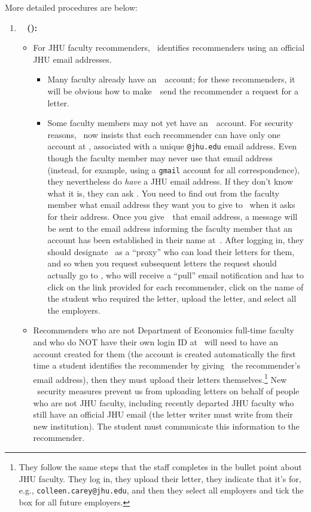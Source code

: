 \documentclass{\classes/econtex}
\begin{document}
More detailed procedures are below:
\begin{enumerate}

\item \textbf{\EJM ~ (\EJMLink):}
  \begin{itemize}
  \item For JHU faculty recommenders, \EJM~identifies recommenders using
    an official JHU email addresses.  

    \begin{itemize}
    \item Many faculty already have an~\EJM~account; for these
      recommenders, it will be obvious how to make~\EJM~send the
      recommender a request for a letter.

    \item Some faculty members may not yet have an~\EJM~account.  
      For security reasons, \EJM~now insists that each
      recommender can have only one account at \EJM, associated with a
      unique \texttt{@jhu.edu} email address.  Even though the faculty member may never use
      that email address (instead, for example, using a \texttt{gmail}
      account for all correspondence), they nevertheless do \textit{    have} a
      JHU email address.  If they don't know what it is, they can ask
      \jmstaffemail.  You need to find out from the faculty member what email
      address they want you to give to \EJM~when it asks for their address.  Once you
      give~\EJM~that email address, a message will be sent to the email
      address informing the faculty member that an account has been
      established in their name at~\EJM.  After logging in, they should
      designate \jmstaffemail~as a ``proxy'' who can load their letters
      for them, and so when you request subsequent letters the request should
      actually go to \jmstaffemail, who will receive a ``pull'' email
      notification and has to click on the link provided for each
      recommender, click on the name of the student who required the
      letter, upload the letter, and select all the employers.

    \end{itemize}


  \item Recommenders who are not Department of Economics full-time faculty and who do NOT have their own
    login ID at \EJM~will need to have an account created for them (the account is created automatically the first time a student identifies the recommender by giving \EJM~the recommender's email address), then they must upload their letters themselves.\footnote{They follow the same steps that the
      staff completes in the bullet point about JHU faculty.  They
      log in, they upload their letter, they indicate that it's for, e.g.,
      \texttt{colleen.carey@jhu.edu}, and then they select all employers and tick the box for all
      future employers.}
    New \EJM~security measures prevent us from uploading letters on behalf of people
    who are not JHU faculty, including recently departed JHU faculty who still have an official JHU email (the letter writer must write from their new institution).  The student must communicate this information to  the recommender.


\end{itemize}
\end{enumerate}
\end{document}
